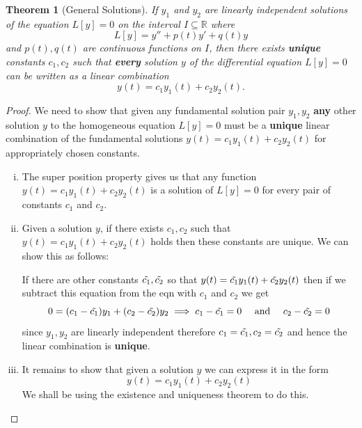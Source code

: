 \documentclass{article}
\theoremstyle{plain}
\newtheorem{thm}{Theorem}[section]
\theoremstyle{definition}
\numberwithin{equation}{section}
\begin{document}
\begin{thm}[General Solutions]
If $y_1$ and $y_2$ are linearly independent solutions of the equation $L[y]=0$ on the interval $I \subseteq \mathbb{R}$ where
\[
    L[y] = y'' + p(t)y' + q(t)y
\]
and $p(t),q(t)$ are continuous functions on $I$, then there exists \textbf{unique} constants $c_1,c_2$ such that \textbf{every} solution $y$ of the differential equation $L[y]=0$ can be written as a linear combination
\[
    y(t) = c_1y_1(t) + c_2y_2(t).
\]
\end{thm}
\begin{proof}
We need to show that given any fundamental solution pair $y_1,y_2$ \textbf{any} other solution $y$ to the homogeneous equation $L[y] = 0$ must be a \textbf{unique} linear combination of the fundamental solutions $y(t) = c_1y_1(t) + c_2y_2(t)$ for appropriately chosen constants.

\begin{enumerate}[(i)]
    \item The super position property gives us that any function $y(t) = c_1y_1(t) + c_2y_2(t)$ is a solution of $L[y] = 0$ for every pair of constants $c_1$ and $c_2$.
    \item Given a solution $y$, if there exists $c_1,c_2$ such that $y(t) = c_1y_1(t) + c_2y_2(t)$ holds then these constants are unique. We can show this as follows:

    If there are other constants $\Tilde{c_1}, \Tilde{c_2}$ so that $y(t) = \Tilde{c_1}y_1(t) + \Tilde{c_2}y_2(t)$ then if we subtract this equation from the eqn with $c_1$ and $c_2$ we get
    \[
        0 = (c_1 - \Tilde{c_1}) y_1 + (c_2-\Tilde{c_2})y_2 \\
        \implies c_1-\Tilde{c_1} = 0 \quad \text{ and } \quad c_2-\Tilde{c_2} = 0
    \]
    since $y_1,y_2$ are linearly independent therefore $c_1=\Tilde{c_1}, c_2=\Tilde{c_2}$ and hence the linear combination is \textbf{unique}.

    \item It remains to show that given a solution $y$ we can express it in the form
    \[
        y(t) = c_1y_1(t) + c_2y_2(t)
    \]
    We shall be using the existence and uniqueness theorem to do this.


\end{enumerate}
\end{proof}
\end{document}
